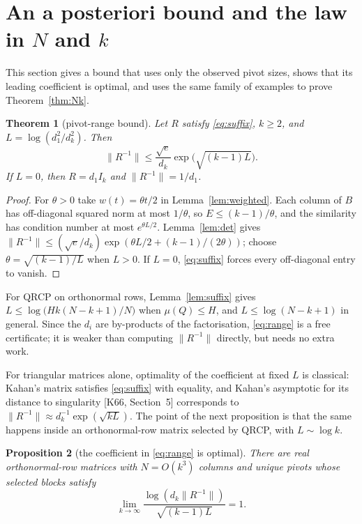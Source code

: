 \documentclass[11pt,a4paper]{article}
\newtheorem{theorem}{Theorem}[section]
\newtheorem{proposition}[theorem]{Proposition}
\theoremstyle{definition}
\numberwithin{equation}{section}
\begin{document}
\section{An a posteriori bound and the law in \texorpdfstring{$N$}{N} and \texorpdfstring{$k$}{k}}\label{sec:range}

This section gives a bound that uses only the observed pivot sizes, shows that its leading coefficient is optimal,
and uses the same family of examples to prove Theorem~\ref{thm:Nk}.

\begin{theorem}[pivot-range bound]\label{thm:range}
Let $R$ satisfy \eqref{eq:suffix}, $k\ge2$, and $L=\log(d_1^2/d_k^2)$. Then
\begin{equation}\label{eq:range}
 \|R^{-1}\|\le\frac{\sqrt e}{d_k}\exp\bigl(\sqrt{(k-1)L}\bigr).
\end{equation}
If $L=0$, then $R=d_1I_k$ and $\|R^{-1}\|=1/d_1$.
\end{theorem}

\begin{proof}
For $\theta>0$ take $w(t)=\theta t/2$ in Lemma~\ref{lem:weighted}. Each column of $B$ has off-diagonal squared norm
at most $1/\theta$, so $E\le(k-1)/\theta$, and the similarity has condition number at most $e^{\theta L/2}$.
Lemma~\ref{lem:det} gives $\|R^{-1}\|\le(\sqrt e/d_k)\exp(\theta L/2+(k-1)/(2\theta))$; choose
$\theta=\sqrt{(k-1)/L}$ when $L>0$. If $L=0$, \eqref{eq:suffix} forces every off-diagonal entry to vanish.
\end{proof}

For QRCP on orthonormal rows, Lemma~\ref{lem:suffix} gives $L\le\log\bigl(Hk(N-k+1)/N\bigr)$ when $\mu(Q)\le H$, and
$L\le\log(N-k+1)$ in general. Since the $d_i$ are by-products of the factorisation, \eqref{eq:range} is a free
certificate; it is weaker than computing $\|R^{-1}\|$ directly, but needs no extra work.

For triangular matrices alone, optimality of the coefficient at fixed $L$ is classical: Kahan's matrix satisfies
\eqref{eq:suffix} with equality, and Kahan's asymptotic for its distance to singularity [K66, Section~5] corresponds to
$\|R^{-1}\|\approx d_k^{-1}\exp(\sqrt{kL})$. The point of the next proposition is that the same happens inside an
orthonormal-row matrix selected by QRCP, with $L\sim\log k$.

\begin{proposition}[the coefficient in \eqref{eq:range} is optimal]\label{prop:range-sharp}
There are real orthonormal-row matrices with $N=O(k^3)$ columns and unique pivots whose selected blocks satisfy
\begin{equation}\label{eq:range-sharp}
 \lim_{k\to\infty}\frac{\log(d_k\|R^{-1}\|)}{\sqrt{(k-1)L}}=1.
\end{equation}
\end{proposition}
\end{document}
